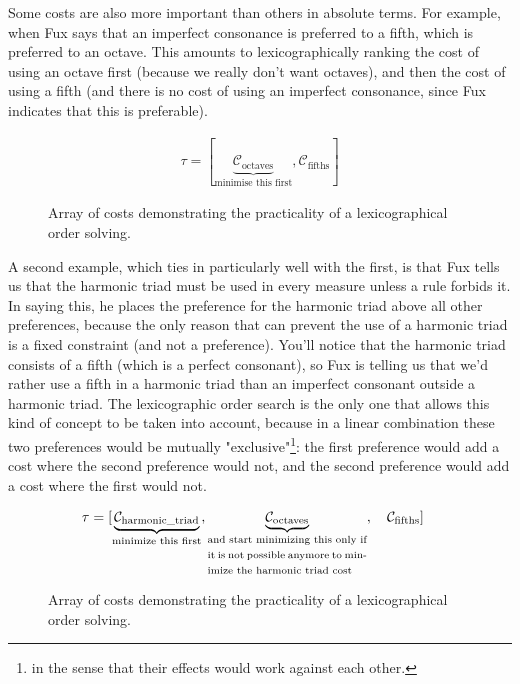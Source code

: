 Some costs are also more important than others in absolute terms. For example, when Fux says that an imperfect consonance is preferred to a fifth, which is preferred to an octave. This amounts to lexicographically ranking the cost of using an octave first (because we really don't want octaves), and then the cost of using a fifth (and there is no cost of using an imperfect consonance, since Fux indicates that this is preferable).
\begin{figure}[h]
    \begin{equation}
        \begin{aligned}
            \tau = [\underset{\text{minimise this first}}{\underbrace{\mathcal{C}_\text{octaves}}}, \mathcal{C}_\text{fifths}]
        \end{aligned}
    \end{equation}
    \caption{Array of costs demonstrating the practicality of a lexicographical order solving.}
\end{figure}

A second example, which ties in particularly well with the first, is that Fux tells us that the harmonic triad must be used in every measure unless a rule forbids it. In saying this, he places the preference for the harmonic triad above all other preferences, because the only reason that can prevent the use of a harmonic triad is a fixed constraint (and not a preference). You'll notice that the harmonic triad consists of a fifth (which is a perfect consonant), so Fux is telling us that we'd rather use a fifth in a harmonic triad than an imperfect consonant outside a harmonic triad. The lexicographic order search is the only one that allows this kind of concept to be taken into account, because in a linear combination these two preferences would be mutually "exclusive"\footnote{in the sense that their effects would work against each other.}: the first preference would add a cost where the second preference would not, and the second preference would add a cost where the first would not.

\begin{figure}[h]
    \begin{equation}
        \begin{aligned}
            \tau = [& \underset{\text{\fontsize{7}{11}\selectfont{minimize this first}}}{\underbrace{\mathcal{C}_\text{harmonic\_triad}}}, \underset{\text{\fontsize{7}{11}\selectfont\parbox{4cm}{and start minimizing this only if it is not possible anymore to minimize the harmonic triad cost}}}{\underbrace{\mathcal{C}_\text{octaves}}},\quad  \mathcal{C}_\text{fifths}]
        \end{aligned}
    \end{equation}
    \caption{Array of costs demonstrating the practicality of a lexicographical order solving.}
\end{figure}

